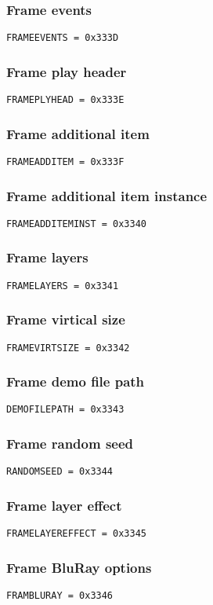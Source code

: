 \documentclass{article}
\begin{document}
\subsubsection{Frame events}
\verb|FRAMEEVENTS = 0x333D|

\subsubsection{Frame play header}
\verb|FRAMEPLYHEAD = 0x333E|

\subsubsection{Frame additional item}
\verb|FRAMEADDITEM = 0x333F|

\subsubsection{Frame additional item instance}
\verb|FRAMEADDITEMINST = 0x3340|

\subsubsection{Frame layers}
\verb|FRAMELAYERS = 0x3341|

\subsubsection{Frame virtical size}
\verb|FRAMEVIRTSIZE = 0x3342|

\subsubsection{Frame demo file path}
\verb|DEMOFILEPATH = 0x3343|

\subsubsection{Frame random seed}
\verb|RANDOMSEED = 0x3344|

\subsubsection{Frame layer effect}
\verb|FRAMELAYEREFFECT = 0x3345|

\subsubsection{Frame BluRay options}
\verb|FRAMBLURAY = 0x3346|
\end{document}
